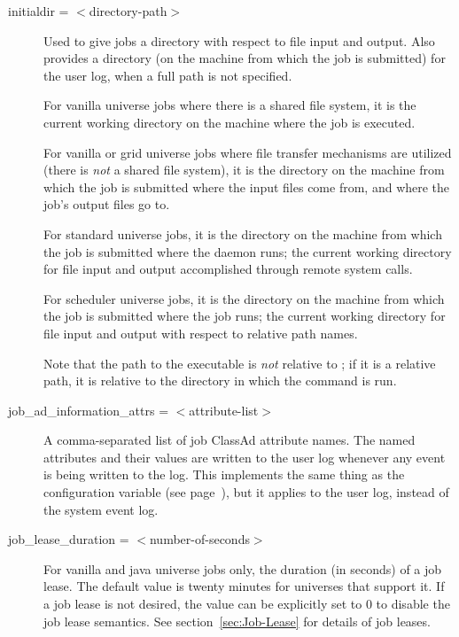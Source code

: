 \begin{description}

\label{man-condor-submit-initialdir}
\item[initialdir = $<$directory-path$>$] 
Used to give jobs a directory with respect to file input and output.
Also provides a directory 
(on the machine from which the job is submitted)
for the user log, when a full path is not specified. 

For vanilla universe jobs where there is a shared file system,
it is the current working directory on the machine where the
job is executed.

For vanilla or grid universe jobs where file transfer mechanisms are
utilized (there is \emph{not} a shared file system),
it is the directory on the machine from which the job is submitted
where the input files come from, and where the job's output
files go to.

For standard universe jobs,
it is the directory on the machine from which the job is submitted
where the  daemon runs;
the current working directory for file input and output accomplished
through remote system calls.

For scheduler universe jobs,
it is the directory on the machine from which the job is submitted
where the job runs;
the current working directory for file input and output with
respect to relative path names.

Note that the path to the executable is \emph{not} relative to
; if it is a relative path, it is relative to the
directory in which the  command is run.


\label{man-condor-submit-job-ad-information-attrs}
\item[job\_ad\_information\_attrs =  $<$attribute-list$>$]
A comma-separated list of job ClassAd attribute names.
The named attributes and their values are written to the user log
whenever any event is being written to the log.
This implements the same thing as the configuration variable
 (see
page~\pageref{param:EventLogJobAdInformationAttrs}),
but it applies to the user log, instead of the system event log.


\label{condor-submit-job-lease-duration}
\item[job\_lease\_duration = $<$number-of-seconds$>$] For vanilla
and java universe jobs only, the duration (in seconds) of a
job lease.
The default value is twenty minutes for universes that support it.
If a job lease is not desired, the value can be explicitly set to 0 to
disable the job lease semantics.
See section~\ref{sec:Job-Lease} for details of job leases.


\end{description}
